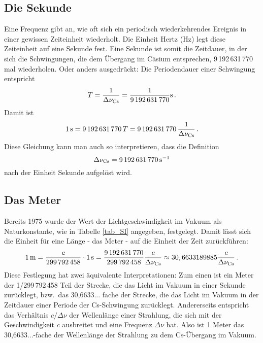 \subsection{Die Sekunde}
\label{sec_Sekunde}

Eine Frequenz gibt an, 
wie oft sich ein periodisch wiederkehrendes Ereignis in einer gewissen
Zeiteinheit wiederholt. Die Einheit Hertz (Hz) legt diese Zeiteinheit auf eine Sekunde fest. 
Eine Sekunde ist somit die Zeitdauer, in der sich die Schwingungen, die dem \"Ubergang im
C\"asium entsprechen, 9\,192\,631\,770 mal wiederholen. Oder anders ausgedr\"uckt: Die 
Periodendauer einer Schwingung entspricht 
\begin{equation}
               T = \frac{1}{\Delta \nu_{\rm Cs}} = \frac{1}{ 9\,192\,631\,770} {\rm s} \, .
\end{equation}  
Damit ist
\begin{equation}
               1\,{\rm s}  =  9\,192\,631\,770 \, T = 9\,192\,631\,770 \, \frac{1}{\Delta \nu_{\rm Cs}} \, .
\end{equation}  
Diese Gleichung kann man auch so interpretieren, dass die Definition
\begin{equation}
               \Delta \nu_{\rm Cs}  =  9\,192\,631\,770 \, {\rm s}^{-1}
\end{equation}  
nach der Einheit Sekunde aufgel\"ost wird. 

\subsection{Das Meter}

Bereits 1975 wurde der Wert der Lichtgeschwindigkeit 
im Vakuum als Naturkonstante,
wie in Tabelle \ref{tab_SI} angegeben, festgelegt. Damit l\"asst sich die Einheit f\"ur
eine L\"ange - das Meter - auf die Einheit der Zeit zur\"uckf\"uhren:
\begin{equation}
              1\,{\rm m} =                 \frac{c}{299\,792\,458} \cdot 1 \,{\rm s} = 
              \frac{9\,192\,631\,770}{299\,792\,458} \frac{c}{\Delta \nu_{\rm Cs}} 
                 \approx  30,6633189885 \frac{c}{\Delta \nu_{\rm Cs}} \, .
\end{equation}  
Diese Festlegung hat zwei \"aquivalente Interpretationen: Zum einen ist ein Meter der
1/299\,792\,458 Teil der Strecke, die das Licht im Vakuum in einer Sekunde zur\"ucklegt,
bzw.\ das 30,6633... fache der Strecke, die das Licht im Vakuum in der Zeitdauer einer Periode
der Cs-Schwingung zur\"ucklegt. Andererseits entspricht das Verh\"altnis $c/\Delta \nu$
der Wellenl\"ange einer Strahlung, die sich mit der Geschwindigkeit $c$ ausbreitet und eine
Frequenz $\Delta \nu$ hat. Also ist 1 Meter das 30,6633...-fache der 
Wellenl\"ange der Strahlung
zu dem Cs-\"Ubergang im Vakuum. 

